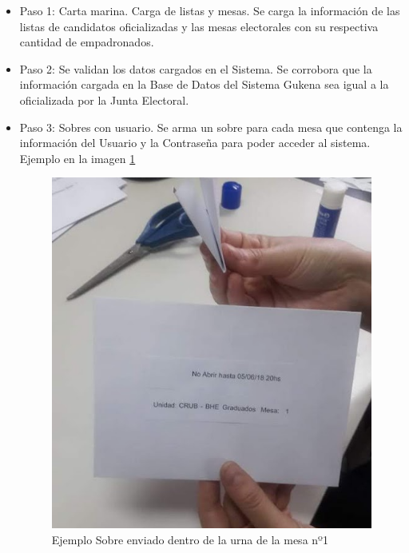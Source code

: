 \begin{itemize}

\item Paso 1: Carta marina. Carga de listas y mesas. Se carga la información de las listas de candidatos oficializadas y las mesas electorales con su respectiva cantidad de empadronados.
\item Paso 2: Se validan los datos cargados en el Sistema. Se corrobora que la información cargada en la Base de Datos del Sistema Gukena sea igual a la oficializada por la Junta Electoral.
\item Paso 3: Sobres con usuario. Se arma un sobre para cada mesa que contenga la información del Usuario y la Contraseña para poder acceder al sistema. Ejemplo en la imagen \ref{graf:ejemploSobre}

\begin{figure}[h!]
    \begin{center}
        \includegraphics[scale=0.5]{img/jKz6EB2F9Z.png}
    \end{center}
  \caption{Ejemplo Sobre enviado dentro de la urna de la mesa nº1}
  \label{graf:ejemploSobre}
\end{figure}


\end{itemize}
